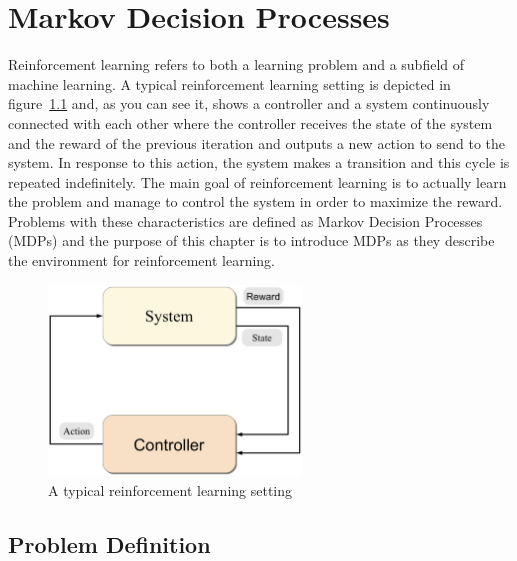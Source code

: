 \chapter{Markov Decision Processes}
\label{chapter2}
\usetikzlibrary{matrix}

\vspace{0.5cm}

\noindent Reinforcement learning refers to both a learning problem and a subfield of machine learning. A typical reinforcement learning setting is depicted in figure~\ref{fig:rlsetting} and, as you can see it, shows a controller and a system continuously connected with each other where the controller receives the state of the system and the reward of the previous iteration and outputs a new action to send to the system. In response to this action, the system makes a transition and this cycle is repeated indefinitely. The main goal of reinforcement learning is to actually learn the problem and manage to control the system in order to maximize the reward. Problems with these characteristics are defined as Markov Decision Processes (MDPs) and the purpose of this chapter is to introduce MDPs as they describe the environment for reinforcement learning.
\begin{figure}[ht]
    \centering
    \includegraphics[width=0.6\textwidth]{./pictures/rlsetting.eps}
    \caption{A typical reinforcement learning setting}
    \label{fig:rlsetting}
\end{figure}

\section{Problem Definition}

